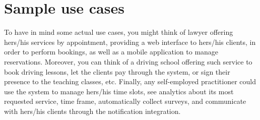 \documentclass{article}
\begin{document}
\section{Sample use cases}
To have in mind some actual use cases, you might think of lawyer offering
hers/his services by appointment, providing a web interface to hers/his
clients, in order to perform bookings, as well as a mobile application to
manage reservations. Moreover, you can think of a driving school offering such
service to book driving lessons, let the clients pay through the system, or
sign their presence to the teaching classes, etc. Finally, any self-employed
practitioner could use the system to manage hers/his time slots, see analytics
about its most requested service, time frame, automatically collect surveys,
and communicate with hers/his clients through the notification integration.




\end{document}
